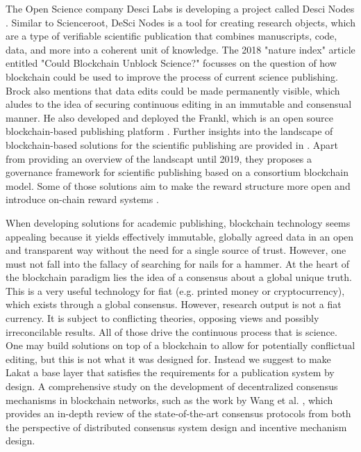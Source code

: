 \documentclass[14pt]{article}
\begin{document}
The Open Science company Desci Labs is developing a project called Desci Nodes \cite{descilabs}. Similar to Scienceroot, DeSci Nodes is a tool for creating research objects, which are a type of verifiable scientific publication that combines manuscripts, code, data, and more into a coherent unit of knowledge.  
The 2018 "nature index" article \cite{brock2018} entitled "Could Blockchain Unblock Science?" focusses on the question of how blockchain could be used to improve the process of current science publishing. Brock also mentions that data edits could be made permanently visible, which aludes to the idea of securing continuous editing in an immutable and consensual manner. He also developed and deployed the Frankl, which is an open source blockchain-based publishing platform \cite{brockOpenScience2018}.
Further insights into the landscape of blockchain-based solutions for the scientific publishing are provided in \cite{mackey2019framework}. Apart from providing an overview of the landscapt until 2019, they proposes a governance framework for scientific publishing based on a consortium blockchain model. Some of those solutions aim to make the reward structure more open and introduce on-chain reward systems \cite{calcaterra2018chain}.


When developing solutions for academic publishing, blockchain technology seems appealing because it yields effectively immutable, globally agreed data in an open and transparent way without the need for a single source of trust. However, one must not fall into the fallacy of searching for nails for a hammer. At the heart of the blockchain paradigm lies the idea of a consensus about a global unique truth. This is a very useful technology for fiat (e.g. printed money or cryptocurrency), which exists through a global consensus. However, research output is not a fiat currency. It is subject to conflicting theories, opposing views and possibly irreconcilable results. All of those drive the continuous process that is science. One may build solutions on top of a blockchain to allow for potentially conflictual editing, but this is not what it was designed for. Instead we suggest to make Lakat a base layer that satisfies the requirements for a publication system by design. A comprehensive study on the development of decentralized consensus mechanisms in blockchain networks, such as the work by Wang et al. \cite{wang2019survey}, which provides an in-depth review of the state-of-the-art consensus protocols from both the perspective of distributed consensus system design and incentive mechanism design.
   
\end{document}
